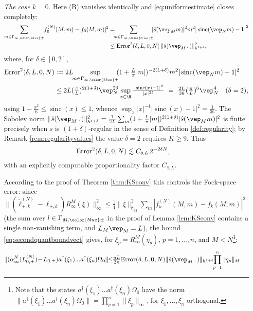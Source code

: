 \documentclass[a4paper, 11pt]{article}
\newcommand{\fh}{\mathfrak{h}}
\DeclareMathOperator{\1}{\mathds{1}}
\DeclareMathOperator{\sinc}{sinc}
\begin{document}
\noindent\emph{The case $k=0$.} Here (B) vanishes identically and \eqref{eq:uniformestimate} closes completely:
\begin{align}
\label{eq:errordecay}
\sum_{m\in\Gamma_{\infty,{\color{blue}\pm}}}\!\!\!|f^{(N)}_{0}(M,m)-f_{0}(M,m)|^{2} & = \!\!\!\sum_{m\in\Gamma_{\infty,{\color{blue}\pm}}}\!\!\!|\hat{s}(\vep_{M}m)|^{2}m^{2}\big|\sinc(\vep_{N}m)-1\big|^{2} \\ \nonumber
& \leq \textup{Error}^{2}(\delta,L,0,N)\!\ \|\hat{s}(\vep_{M}\!\ .\!\ )\|^{2}_{h^{1+\delta}},
\end{align}
where, for $\delta\in[0,2]$,
\begin{align}
\label{eq:errordecayexp0}
\textup{Error}^{2}(\delta,L,0,N) & := 2L\!\!\sup_{m\in\Gamma_{\infty,{\color{blue}\pm}}}\!\!(1+\tfrac{L}{\pi}|m|)^{-2(1+\delta)}m^{2}|\sinc(\vep_{N}m)-1|^{2} \\ \nonumber
& \leq 2L(\tfrac{\pi}{L})^{2(1+\delta)}\vep_{N}^{2\delta}\sup_{x\in\R}\tfrac{|\sinc(x)-1|^{2}}{|x|^{2\delta}}\ =\ \tfrac{2L}{36}(\tfrac{\pi}{L})^{6}\vep_{N}^{4}\quad(\delta=2),
\end{align}
using $1-\tfrac{x^{2}}{6}\leq\sinc(x)\leq1$, whence $\sup_{x}|x|^{-4}|\sinc(x)-1|^{2}=\tfrac{1}{36}$. The Sobolev norm $\|\hat{s}(\vep_{M}\!\ .\!\ )\|^{2}_{h^{1+\delta}}=\tfrac{1}{2L}\sum_{m}(1+\tfrac{L}{\pi}|m|)^{2(1+\delta)}|\hat{s}(\vep_{M}m)|^{2}$ is finite precisely when $s$ is $(1+\delta)$-regular in the sense of Definition \ref{def:regularity}; by Remark \ref{rem:regularityvalues} the value $\delta=2$ requires $K\geq9$. Thus
\begin{align}
\label{eq:errorscaling}
\textup{Error}^{2}(\delta,L,0,N) & \lesssim C_{\delta,L}\!\ 2^{-2\delta N},
\end{align}
with an explicitly computable proportionality factor $C_{\delta,L}$.

According to the proof of Theorem \ref{thm:KSconv} this controls the Fock-space error: since $\|(\tilde{\ell}^{(N)}_{\pm,k}-\ell_{\pm,k})R^{M}_{\infty}(\xi)\|^{2}_{\infty}\leq\tfrac{1}{4}\|\xi\|_{\fh_{M}}^{2}\sum_{m}|f^{(N)}_{k}(M,m)-f_{k}(M,m)|^{2}$ (the sum over $l\in\Gamma_{M,{\color{blue}\pm}}$ in the proof of Lemma \ref{lem:KSconv} contains a single non-vanishing term, and $L_{M}\vep_{M}=L$), the bound \eqref{eq:secondquantboundvect} gives, for $\xi_{p}=R^{M}_{\infty}(\eta_{p})$, $p=1,\dots,n$, and $M<N$\footnote{Note that the states $a^{\dagger}(\xi_{1})\dots a^{\dagger}(\xi_{n})\Omega_{0}$ have the norm $\|a^{\dagger}(\xi_{1})\dots a^{\dagger}(\xi_{n})\Omega_{0}\| = \prod_{p=1}^{n}\|\xi_{p}\|_{\infty}$, for $\xi_{1},\dots,\xi_{n}$ orthogonal.}:
\begin{align}
\label{eq:uniformestimateFock}
\|(\alpha^{N}_{\infty}(L^{(N)}_{0,\pm})\!-\!L_{0,\pm})a^{\dagger}(\xi_{1})...a^{\dagger}(\xi_{n})\Omega_{0}\| & \!\!\leq\!\!\tfrac{nL}{2\pi}\textup{Error}(\delta,L,0,N)\|\hat{s}(\vep_{M}\!\ .\!\ )\|_{h^{1+\delta}}\!\!\prod_{p=1}^{n}\!\|\eta_{p}\|_{M}.
\end{align}
\end{document}
